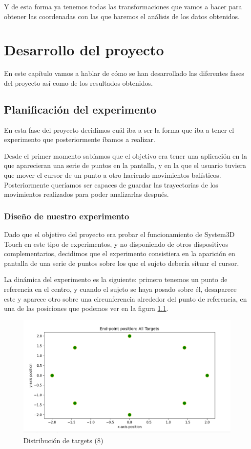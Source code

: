 \documentclass[a4paper,11pt, oneside]{book}
\begin{document}
Y de esta forma ya tenemos todas las transformaciones que vamos a hacer para obtener las coordenadas con las que haremos el análisis de los datos obtenidos.


\chapter{Desarrollo del proyecto}




En este capítulo vamos a hablar de cómo se han desarrollado las diferentes fases del proyecto así como de los resultados obtenidos.

\section{Planificación del experimento}

En esta fase del proyecto decidimos cuál iba a ser la forma que iba a tener el experimento que posteriormente íbamos a realizar.

Desde el primer momento sabíamos que el objetivo era tener una aplicación en la que aparecieran una serie de puntos en la pantalla, y en la que el usuario tuviera que mover el cursor de un punto a otro haciendo movimientos balísticos. Posteriormente queríamos ser capaces de guardar las trayectorias de los movimientos realizados para poder analizarlas después.



\subsection{Diseño de nuestro experimento}

Dado que el objetivo del proyecto era probar el funcionamiento de System3D Touch en este tipo de experimentos, y no disponiendo de otros dispositivos complementarios, decidimos que el experimento consistiera en la aparición en pantalla de una serie de puntos sobre los que el sujeto debería situar el cursor.

La dinámica del experimento es la siguiente: primero tenemos un punto de referencia en el centro, y cuando el sujeto se haya posado sobre él, desaparece este y aparece otro sobre una circunferencia alrededor del punto de referencia, en una de las posiciones que podemos ver en la figura \ref{fig:ocho-puntos}.
\begin{figure}[H]
	
	\centering
	\includegraphics[width=0.7\linewidth]{points}
	\caption{Distribución de targets (8)}
	\label{fig:ocho-puntos}
\end{figure}
\end{document}
